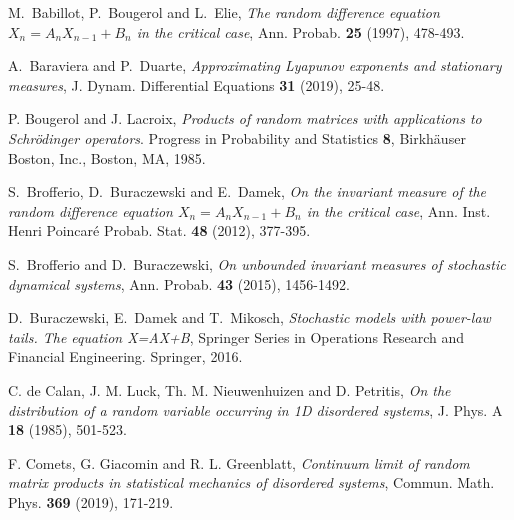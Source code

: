 \documentclass[reqno,11pt]{amsart}
\numberwithin{equation}{section}
\begin{document}
\begin{thebibliography}{99}


 M.~Babillot, P.~Bougerol and L.~Elie, \emph{The random difference equation $X_n=A_n X_{n-1}+B_n$ in the critical case}, Ann. Probab. {\bf 25} (1997), 478-493. 
 
 A.~Baraviera and P.~Duarte, \emph{Approximating Lyapunov exponents and stationary measures}, J. Dynam. Differential Equations {\bf 31} (2019),  25-48.
 
   P. Bougerol  and J. Lacroix,
    \emph{Products of random matrices with applications to {S}chr\"odinger
              operators}.
   Progress in Probability and Statistics 
    {\bf 8},
 {Birkh\"auser Boston, Inc., Boston, MA},
      {1985}.
      
 S.~Brofferio, D.~Buraczewski and E.~Damek,  \emph{On the invariant measure of the random difference equation $X_n=A_n X_{n-1}+B_n$ in the critical case}, Ann. Inst. Henri Poincar\'e Probab. Stat. {\bf 48} (2012),  377-395.  
 
  S.~Brofferio and D.~Buraczewski, \emph{On unbounded invariant measures of stochastic dynamical systems}, Ann. Probab. {\bf 43} (2015),  1456-1492.
 
  D.~Buraczewski, E.~Damek and T.~Mikosch, \emph{Stochastic models with power-law tails. The equation X=AX+B}, Springer Series in Operations Research and Financial Engineering. Springer,  2016.    
      
  C. de Calan,  J. M. Luck, Th. M. Nieuwenhuizen and D. Petritis, \emph{On the distribution of a random variable occurring in 1D disordered systems},  J. Phys. A {\bf 18} (1985),  501-523.     
      
 F. Comets, G. Giacomin and R. L. Greenblatt,
\emph{Continuum limit of random matrix products in statistical mechanics of disordered systems},
Commun. Math. Phys. {\bf 369} (2019), 171-219. 
 
      
     




\end{thebibliography}
\end{document}
